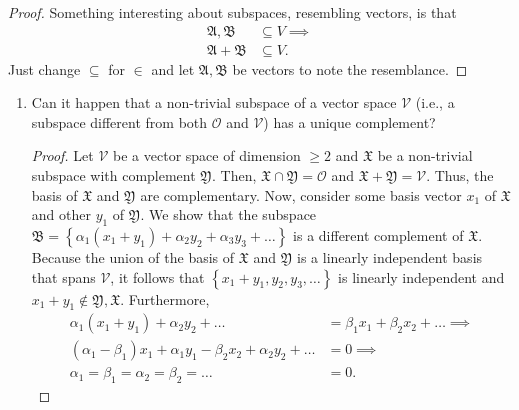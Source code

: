 \documentclass[12pt]{article}
\newcommand{\mf}[1]{\mathfrak{#1}}
\newcommand{\mc}[1]{\mathcal{#1}}
\newenvironment{problem}[2][Problem]{\begin{trivlist} \item[\hskip \labelsep {\bfseries #1}\hskip \labelsep {\bfseries #2.}]}{\end{trivlist}}
\begin{document}
\begin{problem}{5}
\begin{enumerate}
\begin{proof}
Something interesting about subspaces, resembling vectors, is that
\begin{align*}
  \mathfrak{A},\mathfrak{B}&\subseteq V\implies\\
  \mathfrak{A}+\mathfrak{B}&\subseteq V.
\end{align*}
Just change $\subseteq$ for $\in$ and let $\mathfrak{A},\mathfrak{B}$ be vectors to note the resemblance.
\end{proof}
\end{enumerate}
\end{problem}
\begin{problem}{6}
\begin{enumerate}
  \item Can it happen that a non-trivial subspace of a vector space $\mathcal{V}$ (i.e., a subspace different from both $\mc{O}$ and $\mc{V}$) has a unique complement?
\begin{proof}
  Let $\mathcal{V}$ be a vector space of dimension $\geq 2$ and $\mf{X}$ be a non-trivial subspace with complement $\mf{Y}$. Then, $\mf{X}\cap\mf{Y} = \mc{O}$ and $\mf{X} + \mf{Y} = \mc{V}$. Thus, the basis of $\mf{X}$ and $\mf{Y}$ are complementary. Now, consider some basis vector $x_{1}$ of $\mf{X}$ and other $y_{1}$ of $\mf{Y}$. We show that the subspace $\mf{B} = \left\{ \alpha_{1}(x_{1}+y_{1}) + \alpha_{2} y_{2} + \alpha_{3} y_{3} + \dots\right\}$ is a different complement of $\mf{X}$.\\
  Because the union of the basis of $\mf{X}$ and $\mf{Y}$ is a linearly independent basis that spans $\mc{V}$, it follows that $\left\{ x_{1}+y_{1},y_{2},y_{3},\dots \right\}$ is linearly independent and $x_{1}+y_{1}\not\in \mf{Y},\mf{X}$. Furthermore,
\begin{align*}
  \alpha_{1}(x_{1}+y_{1})+\alpha_{2} y_{2} + \dots &= \beta_{1} x_{1} + \beta_{2} x_{2}+ \dots \implies\\
  (\alpha_{1}-\beta_{1})x_{1} + \alpha_{1}y_{1} - \beta_{2}x_{2} + \alpha_{2}y_{2} + \dots &= 0\implies\\
  \alpha_{1}=\beta_{1} =\alpha_{2} = \beta_{2} = \dots &= 0.
\end{align*}


\end{proof}
\end{enumerate}
\end{problem}
\end{document}
